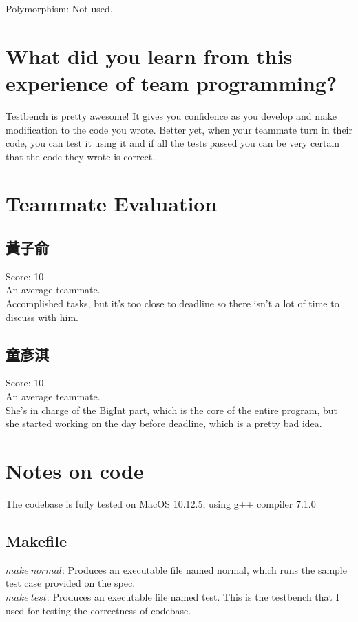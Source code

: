 \documentclass[12pt, A4]{article}
\begin{document}
    Polymorphism: Not used.
    
    \section{What did you learn from this experience of team programming?}
    
    Testbench is pretty awesome! It gives you confidence as you develop and make modification to the code you wrote. Better yet, when your teammate turn in their code, you can test it using it and if all the tests passed you can be very certain that the code they wrote is correct.
    
    \section{Teammate Evaluation}
    
    \subsection{黃子俞}
    
    Score: 10\\
    
    An average teammate. \\
    
    Accomplished tasks, but it's too close to deadline so there isn't a lot of time to discuss with him. \\
    
    \subsection{童彥淇}
    
    Score: 10\\
    
    An average teammate. \\
    
    She's in charge of the BigInt part, which is the core of the entire program, but she started working on the day before deadline, which is a pretty bad idea.\\
    
    \section{Notes on code}
    
    The codebase is fully tested on MacOS 10.12.5, using g++ compiler 7.1.0\\
    
    \subsection{Makefile}
    
    $make\ normal$: Produces an executable file named normal, which runs the sample test case provided on the spec.\\
    
    $make\ test$: Produces an executable file named test. This is the testbench that I used for testing the correctness of codebase.
	
\end{document}
